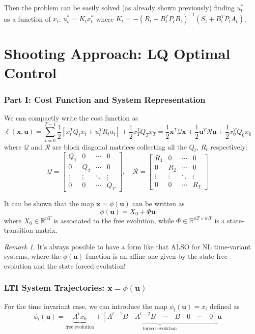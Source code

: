 \documentclass[openany]{book}
\theoremstyle{definition}
\theoremstyle{remark}
\newtheorem*{remark}{Remark}
\begin{document}
Then the problem can be easily solved (as already shown previously) finding $u_t^*$ as a function of $x_t$: $u_t^* = K_tx_t^*$ where $K_t = -(R_t + B_t^TP_tB_t)^{-1}(S_t + B_t^TP_tA_t)$.

\section{Shooting Approach: LQ Optimal Control}

\subsubsection{Part I: Cost Function and System Representation}
We can compactly write the cost function as
\[
\ell(\mathbf{x}, \mathbf{u}) = \sum_{t=0}^{T-1} \frac{1}{2}\left[x_t^T Q_tx_t + u_t^T R_tu_t\right] + \frac{1}{2}x_T^TQ_Tx_T = \frac{1}{2}\mathbf{x}^T \mathcal{Q}\mathbf{x} + \frac{1}{2}\mathbf{u}^T \mathcal{R}\mathbf{u} + \frac{1}{2}x_0^TQ_0x_0
\]
where $\mathcal{Q}$ and $\mathcal{R}$ are block diagonal matrices collecting all the $Q_t$, $R_t$ respectively:
\[
\mathcal{Q} = \begin{bmatrix}
Q_1 & 0 & \cdots & 0 \\
0 & Q_2 & \cdots & 0 \\
\vdots & \vdots & \ddots & \vdots \\
0 & 0 & \cdots & Q_T
\end{bmatrix}, \quad
\mathcal{R} = \begin{bmatrix}
R_1 & 0 & \cdots & 0 \\
0 & R_2 & \cdots & 0 \\
\vdots & \vdots & \ddots & \vdots \\
0 & 0 & \cdots & R_T
\end{bmatrix}
\]

It can be shown that the map $\mathbf{x} = \phi(\mathbf{u})$ can be written as
\[
\phi(\mathbf{u}) = X_0 + \Phi\mathbf{u}
\]
where $X_0 \in \mathbb{R}^{nT}$ is associated to the free evolution, while $\Phi \in \mathbb{R}^{nT \times mT}$ is a state-transition matrix.

\begin{remark}
It's always possible to have a form like that ALSO for NL time-variant systems, where the $\phi(\mathbf{u})$ function is an affine one given by the state free evolution and the state forced evolution!
\end{remark}

\subsubsection{LTI System Trajectories: \texorpdfstring{$\mathbf{x} = \phi(\mathbf{u})$}{x = phi(u)}}
For the time invariant case, we can introduce the map $\phi_t(\mathbf{u}) = x_t$ defined as
\[
\phi_t(\mathbf{u}) = \underbrace{A^tx_0}_{\text{free evolution}} + \underbrace{[A^{t-1}B \quad A^{t-2}B \quad \cdots \quad B \quad 0 \quad \cdots \quad 0]}_{\text{forced evolution}}\mathbf{u}
\]
\end{document}

